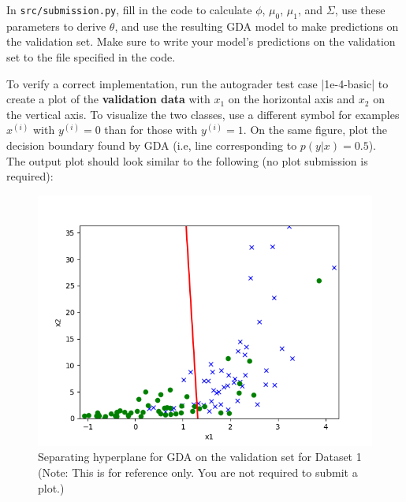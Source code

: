\item {}
In \texttt{src/submission.py}, fill in the code to calculate $\phi$, $\mu_{0}$, $\mu_{1}$, and $\Sigma$, use these parameters to derive $\theta$, and use the resulting GDA model to make predictions on the validation set. Make sure to write your model's predictions on the validation set to the file specified in the code.

To verify a correct implementation, run the autograder test case |1e-4-basic| to create a plot of the \textbf{validation data} with $x_1$ on the horizontal axis and $x_2$ on the vertical axis. To visualize the two classes, use a different symbol for examples $x^{(i)}$ with $y^{(i)} = 0$ than for those with $y^{(i)} = 1$. On the same figure, plot the decision boundary found by GDA (i.e, line corresponding to $p(y\vert x) = 0.5$).\\

The output plot should look similar to the following (no plot submission is required): 

\begin{figure}[H]
	\centering
	\vspace{2mm}
	\includegraphics[width=0.65\linewidth]{01-linearclass/p01e_pred_1.png}
    \caption{Separating hyperplane for GDA on the validation set for Dataset 1 (Note: This is for reference only.  You are not required to submit a plot.)}
\end{figure}
